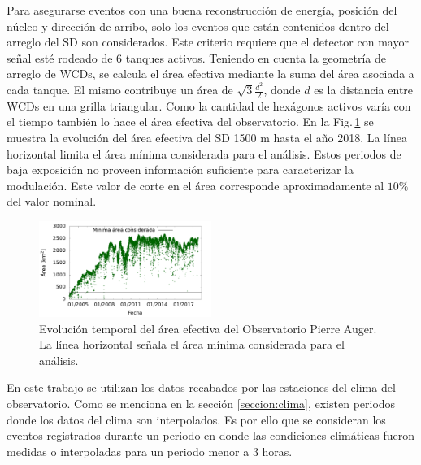 	Para asegurarse eventos con una buena reconstrucción de  energía, posición del núcleo y dirección de arribo, solo los eventos que están contenidos dentro del arreglo del SD son considerados. Este criterio requiere que el detector con mayor señal esté rodeado de 6 tanques activos. Teniendo en cuenta la geometría de arreglo de WCDs, se calcula el área efectiva mediante la suma del área asociada a cada tanque. El mismo contribuye un área de $\sqrt{3} \frac{d^2}{2}$, donde $d$ es la distancia entre WCDs en una grilla triangular. Como la cantidad de hexágonos activos varía con el tiempo también lo hace  el área efectiva del observatorio. En la Fig.\,\ref{fig:area} se muestra la evolución del área efectiva del SD 1500 m hasta el año 2018. La línea horizontal  limita el área mínima considerada para el análisis. Estos periodos de baja exposición no proveen información suficiente para caracterizar la modulación.
	Este valor de corte en el área corresponde aproximadamente al $10\%$ del valor nominal.
	\begin{figure}[H]
		\centering
		\includegraphics[width=0.5\textwidth]{Graphs/clima/area.png}
		\caption{Evolución temporal del área efectiva del Observatorio Pierre Auger. La línea horizontal señala el área mínima considerada para el análisis.}
		\label{fig:area}
	\end{figure}

	En este trabajo se utilizan los datos recabados por las estaciones del clima del observatorio. Como se menciona en la sección \ref{seccion:clima}, existen periodos donde los datos del clima son interpolados. Es por ello que se consideran los eventos registrados durante un periodo en donde las condiciones climáticas fueron medidas o interpoladas para un periodo menor a 3 horas. %

